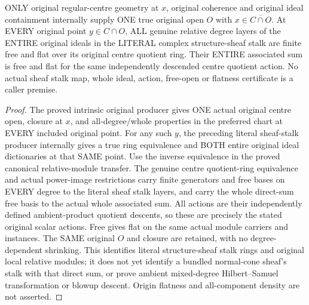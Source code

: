 \begin{theorem}
\label{hir:real-domain-original-all-relative-degrees-free-actual-sheaf-stalk-open}
\leanok
ONLY original regular-centre geometry at $x$, original coherence and
original ideal containment internally supply ONE true original open $O$
with $x\in\overline{C\cap O}$. At EVERY original point $y\in C\cap O$,
ALL genuine relative degree layers of the ENTIRE original ideals in the
LITERAL complex structure-sheaf stalk are finite free and flat over its
original centre quotient ring. Their ENTIRE associated sum is free and
flat for the same independently descended centre quotient action.
No actual sheaf stalk map, whole ideal, action, free-open or flatness
certificate is a caller premise.
\end{theorem}
\begin{proof}
The proved intrinsic original producer gives ONE actual original centre
open, closure at $x$, and all-degree/whole properties in the preferred
chart at EVERY included original point. For any such $y$, the preceding
literal sheaf-stalk producer internally gives a true ring equivalence
and BOTH entire original ideal dictionaries at that SAME point. Use the
inverse equivalence in the proved canonical relative-module transfer.
The genuine centre quotient-ring equivalence and actual power-image
restrictions carry finite generators and free bases on EVERY degree to
the literal sheaf stalk layers, and carry the whole direct-sum free basis
to the actual whole associated sum. All actions are their independently
defined ambient-product quotient descents, so these are precisely the
stated original scalar actions. Free gives flat on the same actual
module carriers and instances. The SAME original $O$ and closure are
retained, with no degree-dependent shrinking. This identifies literal
structure-sheaf stalk rings and original local relative modules; it does
not yet identify a bundled normal-cone sheaf's stalk with that direct sum,
or prove ambient mixed-degree Hilbert--Samuel transformation or blowup
descent. Origin flatness and all-component density are not asserted.
\end{proof}
